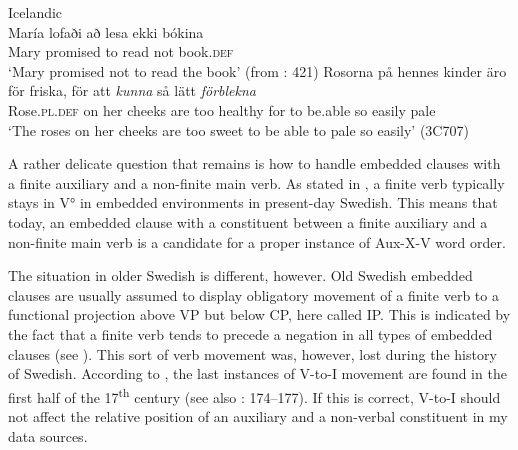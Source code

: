 \documentclass[output=paper, colorlinks, citecolor=brown]{langscibook}
\begin{document}
\ea \label{ex:sangfelt:23}
\ea Icelandic\label{ex:sangfelt:23a}\\
\gll María lofaði að lesa {ekki} bókina \\
 Mary promised to read not book.\textsc{def}\\
\glt ‘Mary promised not to read the book’ (from \citealt{Thrainsson2007}: 421)
\ex\label{ex:sangfelt:23b} \gll Rosorna på hennes kinder äro för friska, för att \textit{kunna} så lätt \textit{förblekna} \\
 Rose.\textsc{pl.def} on her cheeks are too healthy for to be.able so easily pale\\
\glt ‘The roses on her cheeks are too sweet to be able to pale so easily’ (3C707)
\z 
\z

A rather delicate question that remains is how to handle embedded clauses with a finite auxiliary and a non-finite main verb. As stated in , a finite verb typically stays in V° in embedded environments in present-day Swedish. This means that today, an embedded clause with a constituent between a finite auxiliary and a non-finite main verb is a candidate for a proper instance of Aux-X-V word order.


The situation in older Swedish is different, however. Old Swedish embedded clauses are usually assumed to display obligatory movement of a finite verb to a functional projection above VP but below CP, here called IP. This is indicated by the fact that a finite verb tends to precede a negation in all types of embedded clauses (see \citealt{Platzack1988emergence,Falk1993,Hakansson2013}). This sort of verb movement was, however, lost during the history of Swedish. According to \citet{Platzack1988emergence}, the last instances of V-to-I movement are found in the first half of the 17\textsuperscript{th} century (see also \citealt{Falk1993}: 174–177). If this is correct, V-to-I should not affect the relative position of an auxiliary and a non-verbal constituent in my data sources.
\end{document}
